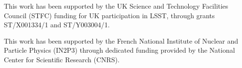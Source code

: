 \documentclass{webofc}
\begin{document}
This work has been supported by the UK Science and Technology Facilities Council (STFC) funding for UK participation in LSST, through grants ST/X001334/1 and ST/Y003004/1.

This work has been supported by the French National Institute of Nuclear and Particle Physics (IN2P3) through dedicated funding provided by the National Center for Scientific Research (CNRS).


\end{document}
